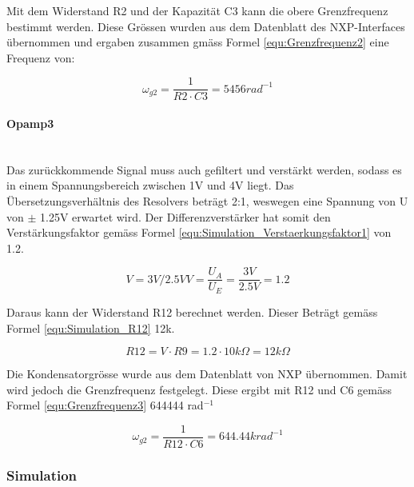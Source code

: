 Mit dem Widerstand R2 und der Kapazität C3 kann die obere Grenzfrequenz bestimmt werden. Diese Grössen wurden aus dem Datenblatt des NXP-Interfaces übernommen und ergaben zusammen gmäss Formel \ref{equ:Grenzfrequenz2} eine Frequenz von:

\begin{equation}
\omega_{g2} = \frac{1}{R2 \cdot C3} = 5456 rad^{-1}
\label{equ:Grenzfrequenz2}
\end{equation}

\paragraph{Opamp3}\mbox{}\\

Das zurückkommende Signal muss auch gefiltert und verstärkt werden, sodass es in einem Spannungsbereich zwischen 1V und 4V liegt. Das Übersetzungsverhältnis des Resolvers beträgt 2:1, weswegen eine Spannung von \textpm \textDelta U von $\pm$ 1.25V erwartet wird. Der Differenzverstärker hat somit den Verstärkungsfaktor gemäss Formel \ref{equ:Simulation_Verstaerkungsfaktor1} von 1.2.

\begin{equation}
V = 3V/2.5V V = \frac{U_A}{U_E} = \frac{3V}{2.5V} = 1.2
\label{equ:Simulation_Verstaerkungsfaktor1}
\end{equation}

Daraus kann der Widerstand R12 berechnet werden. Dieser Beträgt gemäss Formel \ref{equ:Simulation_R12} 12k\textOmega.

\begin{equation}
R12 = V \cdot R9 = 1.2 \cdot 10k\Omega = 12k\Omega
\label{equ:Simulation_R12}
\end{equation}

Die Kondensatorgrösse wurde aus dem Datenblatt von NXP übernommen. Damit wird jedoch die Grenzfrequenz festgelegt. Diese ergibt mit R12 und C6 gemäss Formel \ref{equ:Grenzfrequenz3} 644444 rad$^{-1}$

\begin{equation}
\omega_{g2} = \frac{1}{R12 \cdot C6} = 644.44 krad^{-1}
\label{equ:Grenzfrequenz3}
\end{equation}

\subsubsection{Simulation}


